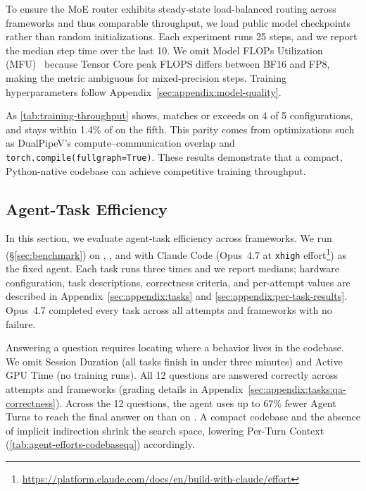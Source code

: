 To ensure the MoE router exhibits steady-state load-balanced
routing across frameworks and thus comparable throughput,
we load public model checkpoints rather than random initializations.
Each experiment runs 25 steps, and we report the median step
time over the last 10. We omit Model FLOPs Utilization
(MFU)~\cite{chowdhery2023palm} because Tensor Core peak FLOPS differs
between BF16 and FP8, making the metric ambiguous for 
mixed-precision steps.
Training hyperparameters follow
Appendix~\ref{sec:appendix:model-quality}.

As \autoref{tab:training-throughput} shows, \sys matches or exceeds
\megatron on 4 of 5 configurations, and stays within 1.4\% of
\megatron on the fifth. This parity comes from optimizations such
as DualPipeV's compute--communication overlap and
\texttt{torch.compile(fullgraph=True)}. These results demonstrate
that a compact, Python-native codebase can achieve competitive
training throughput.

\subsection{Agent-Task Efficiency}
\label{sec:eval:agent}

In this section, we evaluate agent-task efficiency across
frameworks.
We run \sysbench (\S\ref{sec:benchmark}) on \megatron, \torchtitan,
and \sys with Claude Code (Opus~4.7 at
\texttt{xhigh} effort\protect\footnote{\url{https://platform.claude.com/docs/en/build-with-claude/effort}})
as the fixed agent. Each task runs three times and we report
medians; hardware configuration, task descriptions, correctness criteria, and per-attempt
values are described in Appendix~\ref{sec:appendix:tasks} and
\ref{sec:appendix:per-task-results}. Opus~4.7 completed
every task across all attempts and frameworks with no failure.

Answering a question requires locating where a behavior lives in
the codebase. We omit Session Duration (all tasks finish in under
three minutes) and Active GPU Time (no training runs). All 12
questions are answered correctly across attempts and frameworks
(grading details in
Appendix~\ref{sec:appendix:tasks:qa-correctness}).
Across the 12 questions, the agent uses up to 67\% fewer Agent Turns to reach the final answer on \sys than on \megatron.
A compact codebase and the
absence of implicit indirection shrink the search space, lowering
Per-Turn Context (\autoref{tab:agent-efforts-codebaseqa})
accordingly.

